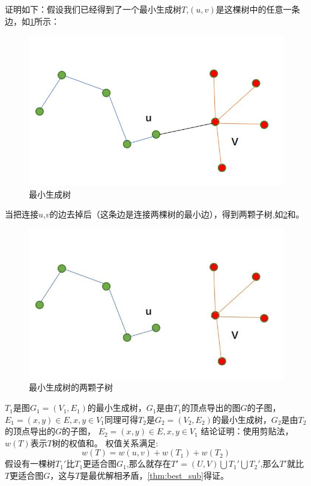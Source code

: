 \documentclass{cumcmthesis}
\begin{document}
    证明如下：假设我们已经得到了一个最小生成树$T$,$(u,v)$是这棵树中的任意一条边，如\cref{fig:mst}所示：
    
    \begin{figure}[!h]
      \centering
      \includegraphics[width=.8\textwidth]{figure/mst.jpg}
      \caption{最小生成树}
      \label{fig:mst}
    \end{figure}
    
    当把连接$u$,$v$的边去掉后（这条边是连接两棵树的最小边），得到两颗子树,如\cref{fig:mst_split}和。
    
    \begin{figure}[!h]
      \centering
      \includegraphics[width=.8\textwidth]{figure/mst_split.jpg}
      \caption{最小生成树的两颗子树}
      \label{fig:mst_split}
    \end{figure}
    
    $T_{1}$是图$G_{1}=(V_{1},E_{1})$的最小生成树，$G_{1}$是由$T_{1}$的顶点导出的图$G$的子图，$E_{1}={(x,y)\in E,x,y\in V_{1}}$同理可得$T_{2}$是$G_{2}=(V_{2},E_{2})$的最小生成树，$G_{2}$是由$T_{2}$的顶点导出的$G$的子图，
    $E_{2}={(x,y)\in E,x,y\in V_{1}}$
    结论证明：使用剪贴法，$w(T)$表示$T$树的权值和。
    权值关系满足:$$w(T)=w(u,v)+w(T_{1})+w(T_{2})$$
    假设有一棵树$T_{1}'$比$T_{1}$更适合图$G_{1}$,那么就存在$T'={(U,V)}\bigcup T_{1}'\bigcup T_{2}'$,那么$T'$就比$T$更适合图$G$，这与$T$是最优解相矛盾，\cref{thm:best_sub}得证。
    
\end{document}

